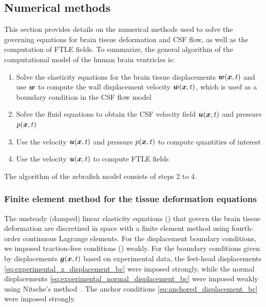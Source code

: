 \documentclass{template}
\begin{document}
\subsection{Numerical methods}
\label{sec:numerical_methods}

This section provides details on the numerical methods used
to solve the governing equations for brain tissue deformation and CSF flow,
as well as the computation of FTLE fields.
To summarize, the general algorithm of the computational model of the human
brain ventricles is:
\begin{enumerate}
    \item Solve the elasticity equations for the brain tissue displacements $\bm{w}(\bm{x}, t)$
    and use $\bm{w}$ to compute the wall displacement velocity $\dot{\bm{w}}(\bm{x}, t)$,
    which is used as a boundary condition in the CSF flow model
    \item Solve the fluid equations to obtain the CSF velocity field $\bm{u}(\bm{x}, t)$ and pressure $p(\bm{x}, t)$
    \item Use the velocity $\bm{u}(\bm{x}, t)$ and pressure $p(\bm{x}, t)$ to compute quantities of interest
    \item Use the velocity $\bm{u}(\bm{x}, t)$ to compute FTLE fields
\end{enumerate}
The algorithm of the zebrafish model consists of steps 2 to 4.

\subsubsection{Finite element method for the tissue deformation equations}
The unsteady (damped) linear elasticity equations ()
that govern the brain tissue deformation are discretized in space with a finite element method 
using fourth-order continuous Lagrange elements. For the displacement boundary conditions,
we imposed traction-free conditions ()
weakly. For the boundary conditions given by displacements $\bm{g}(\bm{x}, t)$ based on experimental data,
the feet-head displacements \eqref{eq:experimental_z_displacement_bc} were imposed strongly,
while the normal displacements \eqref{eq:experimental_normal_displacement_bc}
were imposed weakly using Nitsche's method~\citep{Nitsche1971UberSind,
benzaken2024constructing}. The anchor conditions \eqref{eq:anchored_displacement_bc}
were imposed strongly.
\end{document}
